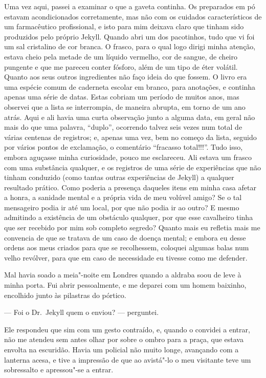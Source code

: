Uma vez aqui, passei a examinar o que a gaveta continha.  Os preparados
em pó estavam acondicionados corretamente, mas não com os cuidados
característicos de um farmacêutico profissional, e isto para mim
deixava claro que tinham sido produzidos pelo próprio Jekyll.  Quando
abri um dos pacotinhos, tudo que vi foi um sal cristalino de cor
branca.  O frasco, para o qual logo dirigi minha atenção, estava cheio
pela metade de um líquido vermelho, cor de sangue, de cheiro pungente e
que me pareceu conter fósforo, além de um tipo de éter volátil.  Quanto
aos seus outros ingredientes não faço ideia do que fossem.  O livro era
uma espécie comum de caderneta escolar em branco, para anotações, e
continha apenas uma série de datas.  Estas cobriam um período de muitos
anos, mas observei que a lista se interrompia, de maneira abrupta, em
torno de um ano atrás.  Aqui e ali havia uma curta observação junto a
alguma data, em geral não mais do que uma palavra, “duplo”, ocorrendo
talvez seis vezes num total de várias centenas de registros; e, apenas
uma vez, bem no começo da lista, seguido por vários pontos de
exclamação, o comentário “fracasso total!!!”.  Tudo isso, embora
aguçasse minha curiosidade, pouco me esclareceu.  Ali
estava um frasco com uma substância qualquer, e os registros de uma
série de experiências que não tinham conduzido (como tantas outras
experiências de Jekyll) a qualquer resultado prático.  Como poderia a
presença daqueles itens em minha casa afetar a honra, a sanidade mental
e a própria vida de meu volúvel amigo?  Se o tal mensageiro podia ir     
até um local, por que não podia ir ao outro?  E mesmo admitindo a         
existência de um obstáculo qualquer, por que esse cavalheiro tinha que   
ser recebido por mim sob completo segredo?  Quanto mais eu refletia
mais me convencia de que se tratava de um caso de doença mental; e
embora eu desse ordens aos meus criados para que se recolhessem,
coloquei algumas balas num velho revólver, para que em caso de
necessidade eu tivesse como me defender. 

Mal havia soado a meia"-noite em Londres quando a aldraba soou de leve à
minha porta.  Fui abrir pessoalmente, e me deparei com um homem
baixinho, encolhido junto às pilastras do pórtico.

--- Foi o Dr.~Jekyll quem o enviou? --- perguntei.

Ele respondeu que sim com um gesto contraído, e, quando o convidei a
entrar, não me atendeu sem antes olhar por sobre o ombro para a praça,
que estava envolta na escuridão.  Havia um policial não muito longe,
avançando com a lanterna acesa, e tive a impressão de que ao avistá"-lo
o meu visitante teve um sobressalto e apressou"-se a entrar.

